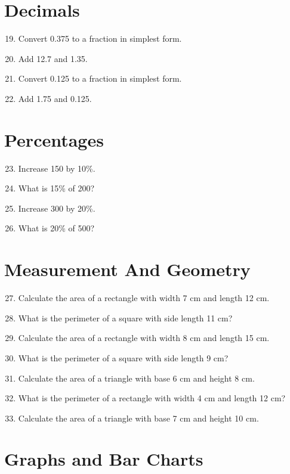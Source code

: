 \documentclass[10pt,a4paper]{article}
\begin{document}
\section*{Decimals}

\begin{enumerate}
\setcounter{enumi}{18}
\item Convert 0.375 to a fraction in simplest form.
\item Add 12.7 and 1.35.
\item Convert 0.125 to a fraction in simplest form.
\item Add 1.75 and 0.125.
\end{enumerate}

\section*{Percentages}

\begin{enumerate}
\setcounter{enumi}{22}
\item Increase 150 by 10\%.
\item What is 15\% of 200?
\item Increase 300 by 20\%.
\item What is 20\% of 500?
\end{enumerate}

\section*{Measurement And Geometry}

\begin{enumerate}
\setcounter{enumi}{26}
\item Calculate the area of a rectangle with width 7 cm and length 12 cm.
\item What is the perimeter of a square with side length 11 cm?
\item Calculate the area of a rectangle with width 8 cm and length 15 cm.
\item What is the perimeter of a square with side length 9 cm?
\item Calculate the area of a triangle with base 6 cm and height 8 cm.
\item What is the perimeter of a rectangle with width 4 cm and length 12 cm?
\item Calculate the area of a triangle with base 7 cm and height 10 cm.
\end{enumerate}

\section*{Graphs and Bar Charts}
\end{document}
